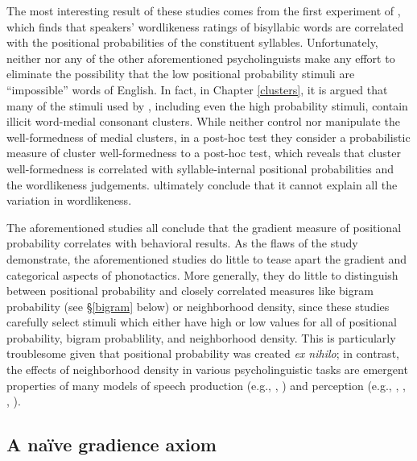 
The most interesting result of these studies comes from the first experiment of \citealt{Vitevitch1997}, which finds that speakers' wordlikeness ratings of bisyllabic words are correlated with the positional probabilities of the constituent syllables. Unfortunately, neither \citeauthor{Vitevitch1997} nor any of the other aforementioned psycholinguists make any effort to eliminate the possibility that the low positional probability stimuli are ``impossible'' words of English. In fact, in Chapter \ref{clusters}, it is argued that many of the stimuli used by \citet{Vitevitch1997}, including even the high probability stimuli, contain illicit word-medial consonant clusters. While \citeauthor{Vitevitch1997} neither control nor manipulate the well-formedness of medial clusters, in a post-hoc test they consider a probabilistic measure of cluster well-formedness to a post-hoc test, which reveals that cluster well-formedness is correlated with syllable-internal positional probabilities and the wordlikeness judgements. \citeauthor{Vitevitch1997} ultimately conclude that it cannot explain all the variation in wordlikeness. 

The aforementioned studies all conclude that the gradient measure of positional probability correlates with behavioral results. As the flaws of the \citet{Vitevitch1997} study demonstrate, the aforementioned studies do little to tease apart the gradient and categorical aspects of phonotactics. More generally, they do little to distinguish between positional probability and closely correlated measures like bigram probability (see \S\ref{bigram} below) or neighborhood density, since these studies carefully select stimuli which either have high or low values for all of positional probability, bigram probablility, and neighborhood density. This is particularly troublesome given that positional probability was created \emph{ex nihilo}; in contrast, the effects of neighborhood density in various psycholinguistic tasks are emergent properties of many models of speech production (e.g., \citealt{Luce1998}, \citealt{Luce2000}) and perception (e.g., \citealt{Marslen-Wilson1984,Marslen-Wilson1987}, \citealt{McClelland1986}, \citealt{Norris1994}, \citealt{Norris2000}). 

\subsection{A naïve gradience axiom}

